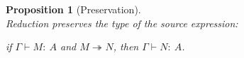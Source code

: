 \documentclass[a4paper]{article}
\newcommand{\typecolor}{}
\newcommand{\termcolor}{}
\newcommand{\tp}[1]{{\typecolor #1}}
\newcommand{\tm}[1]{{\termcolor #1}}
\newtheorem{lemma}[theorem]{Lemma}
\newtheorem{proposition}[theorem]{Proposition}
\newtheorem{definition}{Definition}
\newcommand{\env}{\tp{\Gamma}}
\newcommand{\typing}[2]{\tm{#1:\ }\tp{#2}}
\newcommand{\txt}[1]{\text{\textit{#1}}}
\newcommand{\reducestar}[3]{#1 \twoheadrightarrow_{#2} #3}
\newcommand{\subformulas}[1]{\txt{Subformulas}\,(#1)}
\begin{document}
\begin{proposition}[Preservation]\ \\
\label{prop_preservation}
Reduction preserves the type of the source expression:
 
 if $\env \vdash \typing{M}{A}$ and $\reducestar{M}{}{N}$, then 
$\env \vdash \typing{N}{A}$.
\end{proposition}


 
 

 
 
\end{document}
